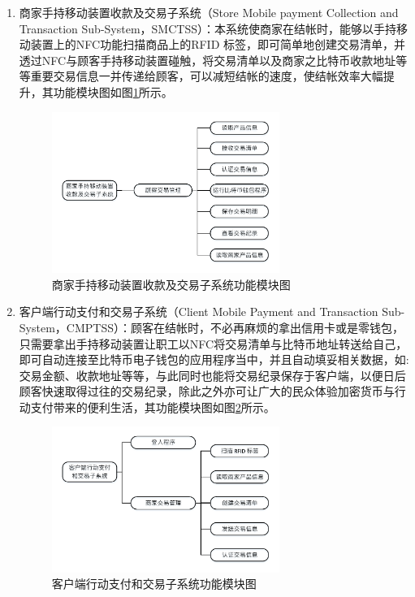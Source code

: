 \begin{enumerate}
		\item 商家手持移动装置收款及交易子系统（Store Mobile payment Collection and Transaction Sub-System，SMCTSS）：本系统使商家在结帐时，能够以手持移动装置上的NFC功能扫描商品上的RFID 标签，即可简单地创建交易清单，并透过NFC与顾客手持移动装置碰触，将交易清单以及商家之比特币收款地址等等重要交易信息一并传递给顾客，可以减短结帐的速度，使结帐效率大幅提升，其功能模块图如图\ref{model2}所示。
		 
			\begin{figure}[!htbp]
			\centering
			\includegraphics[width = 0.7\textwidth]{model2.pdf}
			\caption{商家手持移动装置收款及交易子系统功能模块图}\label{model2}
			\end{figure}


		\item 客户端行动支付和交易子系统（Client Mobile Payment and Transaction Sub-System，CMPTSS）：顾客在结帐时，不必再麻烦的拿出信用卡或是零钱包，只需要拿出手持移动装置让职工以NFC将交易清单与比特币地址转送给自己，即可自动连接至比特币电子钱包的应用程序当中，并且自动填妥相关数据，如:交易金额、收款地址等等，与此同时也能将交易纪录保存于客户端，以便日后顾客快速取得过往的交易纪录，除此之外亦可让广大的民众体验加密货币与行动支付带来的便利生活，其功能模块图如图\ref{model3}所示。
			\begin{figure}[!htbp]
			\centering
			\includegraphics[width = 0.7\textwidth]{model3.pdf}
			\caption{客户端行动支付和交易子系统功能模块图}\label{model3}
			\end{figure}
		
	\end{enumerate}
	

